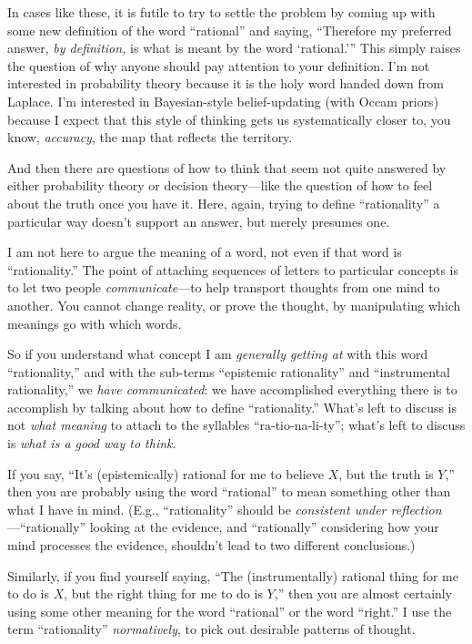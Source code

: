 {
 In cases like these, it is futile to try to settle the problem by
coming up with some new definition of the word
``rational'' and saying,
``Therefore my preferred answer, \textit{by
definition,} is what is meant by the word
`rational.''' This
simply raises the question of why anyone should pay attention to your
definition. I'm not interested in probability theory
because it is the holy word handed down from Laplace.
I'm interested in Bayesian-style belief-updating (with
Occam priors) because I expect that this style of thinking gets us
systematically closer to, you know, \textit{accuracy}, the map that
reflects the territory.}

{
 And then there are questions of how to think that seem not quite
answered by either probability theory or decision theory---like the
question of how to feel about the truth once you have it. Here, again,
trying to define ``rationality'' a
particular way doesn't support an answer, but merely
presumes one.}

{
 I am not here to argue the meaning of a word, not even if that
word is ``rationality.'' The point
of attaching sequences of letters to particular concepts is to let two
people \textit{communicate}{}---to help transport thoughts from one
mind to another. You cannot change reality, or prove the thought, by
manipulating which meanings go with which words.}

{
 So if you understand what concept I am \textit{generally getting
at} with this word ``rationality,''
and with the sub-terms ``epistemic
rationality'' and ``instrumental
rationality,'' we \textit{have communicated}: we have
accomplished everything there is to accomplish by talking about how to
define ``rationality.''
What's left to discuss is not \textit{what meaning} to
attach to the syllables
``ra-tio-na-li-ty'';
what's left to discuss is \textit{what is a good way to
think}.}

{
 If you say, ``It's
(epistemically) rational for me to believe $X$, but the truth is
$Y$,'' then you are probably using the word
``rational'' to mean something other
than what I have in mind. (E.g.,
``rationality'' should be
\textit{consistent under
reflection}{}---``rationally''
looking at the evidence, and
``rationally'' considering how your
mind processes the evidence, shouldn't lead to two
different conclusions.)}

{
 Similarly, if you find yourself saying, ``The
(instrumentally) rational thing for me to do is $X$, but the right thing
for me to do is $Y$,'' then you are almost certainly
using some other meaning for the word
``rational'' or the word
``right.'' I use the term
``rationality''
\textit{normatively}, to pick out desirable patterns of thought.}

